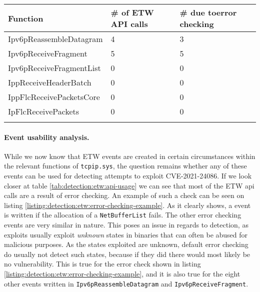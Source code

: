 \documentclass{report}
\begin{document}
{
\begin{tabularx}{\textwidth}{llX}
\textbf{Function}        & \textbf{\# of \gls{ETW} API calls} & \textbf{\# due to\newline error checking} \\ \hline
Ipv6pReassembleDatagram  & 4                            & 3                                 \\
Ipv6pReceiveFragment     & 5                            & 5                                 \\
Ipv6pReceiveFragmentList & 0                            & 0                                 \\
IppReceiveHeaderBatch    & 0                            & 0                                 \\
IppFlcReceivePacketsCore & 0                            & 0                                 \\
IpFlcReceivePackets      & 0                            & 0                                 \\
\caption{\gls{ETW} API calls for functions related to CVE-2021-24086}
\label{tab:detection:etw:api-usage}
\end{tabularx}
}


\paragraph{Event usability analysis.}
While we now know that \gls{ETW} events are created in certain circumstances within the relevant functions of \texttt{tcpip.sys}, the question remains whether any of these events can be used for detecting attempts to exploit CVE-2021-24086. If we look closer at table \ref{tab:detection:etw:api-usage} we can see that most of the \gls{ETW} api calls are a result of error checking. An example of such a check can be seen on listing \ref{listing:detection:etw:error-checking-example}. As it clearly shows, a event is written if the allocation of a \texttt{NetBufferList} fails. The other error checking events are very similar in nature. This poses an issue in regards to detection, as exploits usually exploit \emph{unknown} states in binaries that can often be abused for malicious purposes. As the states exploited are unknown, default error checking do usually not detect such states, because if they did there would most likely be no vulnerability. This is true for the error check shown in listing \ref{listing:detection:etw:error-checking-example}, and it is also true for the eight other events written in \texttt{Ipv6pReassembleDatagram} and \texttt{Ipv6pReceiveFragment}.
\end{document}
